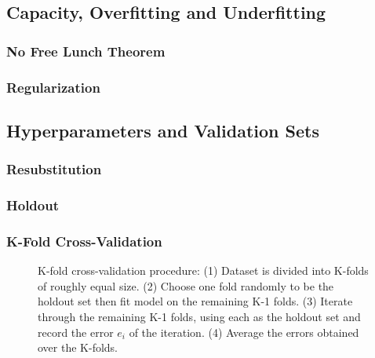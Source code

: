 \subsection{Capacity, Overfitting and Underfitting}

\subsubsection{No Free Lunch Theorem}

\subsubsection{Regularization}

\subsection{Hyperparameters and Validation Sets}

\subsubsection{Resubstitution}

\subsubsection{Holdout}

\subsubsection{K-Fold Cross-Validation}

\begin{figure}[htbp]
    \centering
    
    \captionsetup{format=hang} %
    \caption{
        K-fold cross-validation procedure: (1) Dataset is divided into K-folds
        of roughly equal size. (2) Choose one fold randomly to be the
        holdout set then fit model on the remaining K-1 folds. (3)
        Iterate through the remaining K-1 folds, using each as the holdout set
        and record the error $e_i$ of the iteration. (4) Average the errors
        obtained over the K-folds.
    }
    \label{fig:kfold-cv}
\end{figure}


